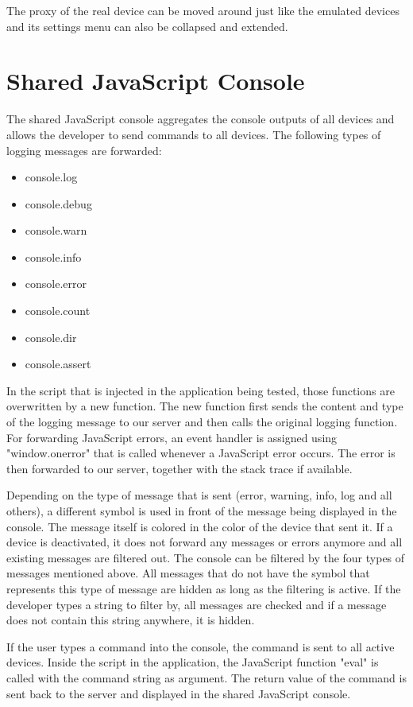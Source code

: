 The proxy of the real device can be moved around just like the emulated devices and its settings menu can  also be collapsed and extended.

\section{Shared JavaScript Console}

The shared JavaScript console aggregates the console outputs of all devices and allows the developer to send commands to all devices. The following types of logging messages are forwarded:
\begin{itemize}
	\item console.log
	\item console.debug
	\item console.warn
	\item console.info
	\item console.error
	\item console.count
	\item console.dir
	\item console.assert
\end{itemize}
In the script that is injected in the application being tested, those functions are overwritten by a new function. The new function first sends the content and type of the logging message to our server and then calls the original logging function. For forwarding JavaScript errors, an event handler is assigned using "window.onerror" that is called whenever a JavaScript error occurs. The error is then forwarded to our server, together with the stack trace if available. 

Depending on the type of message that is sent (error, warning, info, log and all others), a different symbol is used in front of the message being displayed in the console. The message itself is colored in the color of the device that sent it. If a device is deactivated, it does not forward any messages or errors anymore and all existing messages are filtered out. The console can be filtered by the four types of messages mentioned above. All messages that do not have the symbol that represents this type of message are hidden as long as the filtering is active. If the developer types a string to filter by, all messages are checked and if a message does not contain this string anywhere, it is hidden.

If the user types a command into the console, the command is sent to all active devices. Inside the script in the application, the JavaScript function "eval" is called with the command string as argument. The return value of the command is sent back to the server and displayed in the shared JavaScript console.

